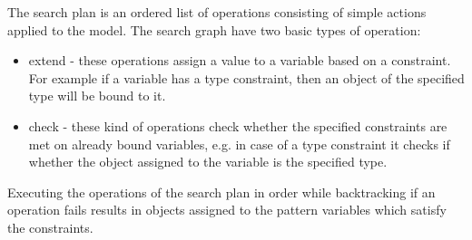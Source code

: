 The search plan is an ordered list of operations consisting of simple actions
applied to the model. The search graph have two basic types of operation:

\begin{itemize}
  \item extend - these operations assign a value to a variable based on a
  constraint. For example if a variable has a type constraint, then an object of
  the specified type will be bound to it.
  \item check - these kind of operations check whether the specified
  constraints are met on already bound variables, e.g. in case of a type
  constraint it checks if whether the object assigned to the variable is the
  specified type.
\end{itemize}

Executing the operations of the search plan in order while backtracking if an
operation fails results in objects assigned to the pattern variables which
satisfy the constraints.
